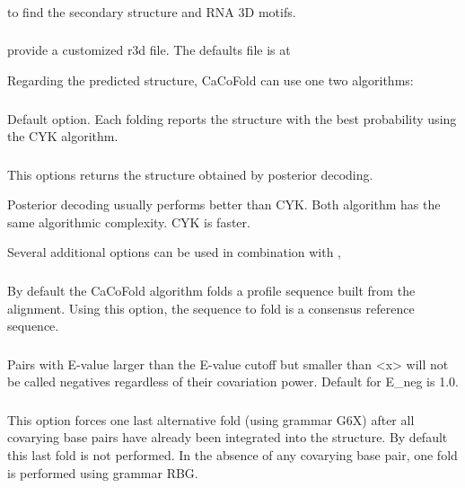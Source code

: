 \subsubsection{} to find the secondary structure and RNA 3D motifs.

\subsubsection{}  provide a customized r3d file. The defaults file is at 

\noindent
Regarding the predicted structure, CaCoFold can use one two algorithms:

\subsubsection{}        Default option. Each folding reports the structure with the best probability using the CYK algorithm.

\subsubsection{}   This options returns the structure obtained by posterior decoding.

\noindent
Posterior decoding usually performs better than CYK. Both algorithm has the same algorithmic complexity. CYK is faster.

\noindent
Several additional options can be used in combination with   ,

\subsubsection{}   By default the CaCoFold algorithm folds a profile sequence built from the alignment. Using this option, the sequence to fold is a consensus reference sequence.

\subsubsection{}   Pairs with E-value larger than the E-value cutoff but smaller than <x> will not be called negatives regardless of their covariation power. Default for E\_neg is 1.0.

\subsubsection{} This option forces one last alternative fold (using grammar G6X) after all covarying base pairs have already been
integrated into the structure. By default this last fold is not
performed. In the absence of any covarying base pair, one fold is
performed using grammar RBG.

